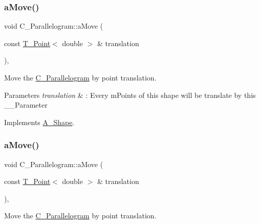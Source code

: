 \subsubsection{\texorpdfstring{a\+Move()}{aMove()}\hspace{0.1cm}{\footnotesize\ttfamily [1/2]}}
{\footnotesize\ttfamily void C\+\_\+\+Parallelogram\+::a\+Move (\begin{DoxyParamCaption}\item[{const \hyperlink{classT__Point}{T\+\_\+\+Point}$<$ double $>$ \&}]{translation }\end{DoxyParamCaption})\hspace{0.3cm}{\ttfamily [override]}, {\ttfamily [virtual]}}



Move the \hyperlink{classC__Parallelogram}{C\+\_\+\+Parallelogram} by point translation. 


\begin{DoxyParams}{Parameters}
{\em translation} & \+: Every m\+Points of this shape will be translate by this \+\_\+\+\_\+\+Parameter \\
\hline
\end{DoxyParams}


Implements \hyperlink{classA__Shape_ab284298db1b557ccfa7ba6de7a5fee2c}{A\+\_\+\+Shape}.

\mbox{\label{classC__Parallelogram_ac77ea776b24c551114d84eaf147f6977}} 
\subsubsection{\texorpdfstring{a\+Move()}{aMove()}\hspace{0.1cm}{\footnotesize\ttfamily [2/2]}}
{\footnotesize\ttfamily void C\+\_\+\+Parallelogram\+::a\+Move (\begin{DoxyParamCaption}\item[{const \hyperlink{classT__Point}{T\+\_\+\+Point}$<$ double $>$ \&}]{translation }\end{DoxyParamCaption})\hspace{0.3cm}{\ttfamily [override]}, {\ttfamily [virtual]}}



Move the \hyperlink{classC__Parallelogram}{C\+\_\+\+Parallelogram} by point translation. 


